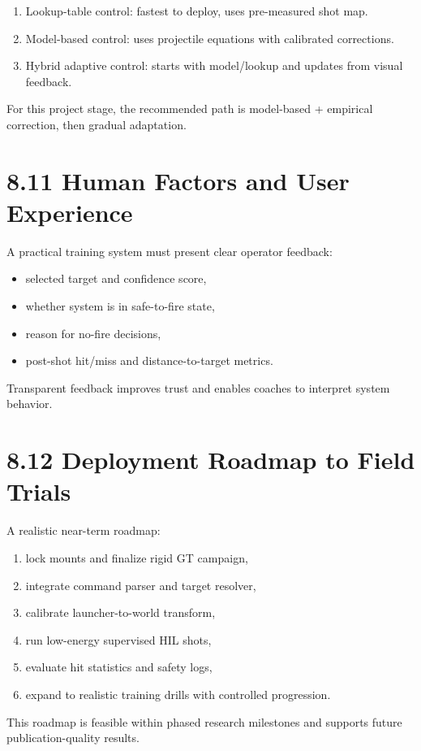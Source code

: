 \begin{enumerate}
  \item Lookup-table control: fastest to deploy, uses pre-measured shot map.
  \item Model-based control: uses projectile equations with calibrated corrections.
  \item Hybrid adaptive control: starts with model/lookup and updates from visual feedback.
\end{enumerate}

For this project stage, the recommended path is model-based + empirical correction, then gradual adaptation.

\section{8.11 Human Factors and User Experience}
A practical training system must present clear operator feedback:
\begin{itemize}
  \item selected target and confidence score,
  \item whether system is in safe-to-fire state,
  \item reason for no-fire decisions,
  \item post-shot hit/miss and distance-to-target metrics.
\end{itemize}

Transparent feedback improves trust and enables coaches to interpret system behavior.

\section{8.12 Deployment Roadmap to Field Trials}
A realistic near-term roadmap:
\begin{enumerate}
  \item lock mounts and finalize rigid GT campaign,
  \item integrate command parser and target resolver,
  \item calibrate launcher-to-world transform,
  \item run low-energy supervised HIL shots,
  \item evaluate hit statistics and safety logs,
  \item expand to realistic training drills with controlled progression.
\end{enumerate}

This roadmap is feasible within phased research milestones and supports future publication-quality results.



